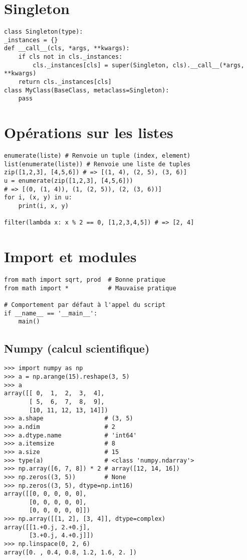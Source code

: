 \documentclass{article}
\begin{document}
\begin{multicols*}{4}
\begin{lstlisting}
\end{lstlisting}

\section*{Singleton}
\begin{lstlisting}
class Singleton(type):
_instances = {}
def __call__(cls, *args, **kwargs):
    if cls not in cls._instances:
        cls._instances[cls] = super(Singleton, cls).__call__(*args, **kwargs)
    return cls._instances[cls]
class MyClass(BaseClass, metaclass=Singleton):
    pass
\end{lstlisting}

\section*{Opérations sur les listes}
\begin{lstlisting}
enumerate(liste) # Renvoie un tuple (index, element)
list(enumerate(liste)) # Renvoie une liste de tuples
zip([1,2,3], [4,5,6]) # => [(1, 4), (2, 5), (3, 6)]
u = enumerate(zip([1,2,3], [4,5,6]))
# => [(0, (1, 4)), (1, (2, 5)), (2, (3, 6))]
for i, (x, y) in u:
    print(i, x, y)

filter(lambda x: x % 2 == 0, [1,2,3,4,5]) # => [2, 4]
\end{lstlisting}

\section*{Import et modules}
\begin{lstlisting}
from math import sqrt, prod  # Bonne pratique
from math import *           # Mauvaise pratique

# Comportement par défaut à l'appel du script
if __name__ == '__main__':
    main()
\end{lstlisting}

\subsection*{Numpy (calcul scientifique)}
\begin{lstlisting}
>>> import numpy as np
>>> a = np.arange(15).reshape(3, 5)
>>> a
array([[ 0,  1,  2,  3,  4],
       [ 5,  6,  7,  8,  9],
       [10, 11, 12, 13, 14]])
>>> a.shape                 # (3, 5)
>>> a.ndim                  # 2
>>> a.dtype.name            # 'int64'
>>> a.itemsize              # 8
>>> a.size                  # 15
>>> type(a)                 # <class 'numpy.ndarray'>
>>> np.array([6, 7, 8]) * 2 # array([12, 14, 16])
>>> np.zeros((3, 5))        # None
>>> np.zeros((3, 5), dtype=np.int16)
array([[0, 0, 0, 0, 0],
       [0, 0, 0, 0, 0],
       [0, 0, 0, 0, 0]])
>>> np.array([[1, 2], [3, 4]], dtype=complex)
array([[1.+0.j, 2.+0.j],
       [3.+0.j, 4.+0.j]])
>>> np.linspace(0, 2, 6)
array([0. , 0.4, 0.8, 1.2, 1.6, 2. ])
\end{lstlisting}


\end{multicols*}
\end{document}
